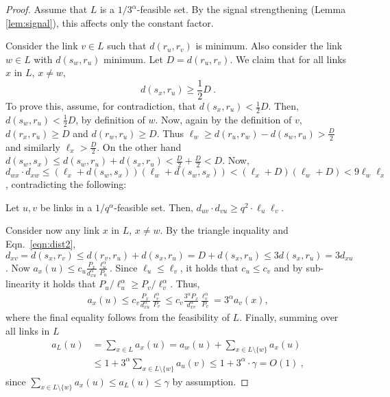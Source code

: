 \documentclass[11pt]{amsart}
\begin{document}
\begin{proof}
Assume that $L$ is a $1/3^\alpha$-feasible set. By the signal
strengthening (Lemma \ref{lem:signal}), this affects only the constant factor.

Consider the link $v \in L$ such that $d(r_u, r_v)$ is minimum.
Also consider the link $w \in L$ with $d(s_{w}, r_u)$ minimum.
Let $D = d(r_u, r_v)$. We claim that for all links $x$ in $L$, $x \ne w$,
\begin{equation}
d(s_x, r_u) \geq \frac{1}{2} D \ .
\label{eqn:dist2}
\end{equation}
To prove this, assume, for contradiction, that $d(s_x, r_u) < \frac{1}{2} D$. 
Then,  $d(s_w, r_u)  < \frac{1}{2} D$, by definition of $w$. 
Now, again by the definition of $v$, $d(r_{x}, r_u) \geq D$ 
and $d(r_w, r_u) \geq D$. 
Thus $\ell_w \geq d(r_u, r_w) - d(s_w, r_u) > \frac{D}{2}$
and similarly $\ell_{x} > \frac{D}{2}$. 
On the other hand $d(s_{w}, s_{x}) \le d(s_w, r_u) + d(s_x, r_u) < 
   \frac{D}{2} + \frac{D}{2} < D$.
Now, $d_{w x} \cdot d_{x w} 
  \leq (\ell_{x} + d(s_{w}, s_{x}))(\ell_w + d(s_w, s_{x})) 
  < (\ell_x + D)(\ell_w + D)
  < 9 \ell_{w} \ell_x$, contradicting the following:
  
  \begin{lemma}
Let $u, v$ be links in a $1/q^\alpha$-feasible set.
Then, $d_{uv} \cdot d_{vu} \ge q^2 \cdot \ell_u \ell_v$. 
\label{lem:ind-separation}
\end{lemma}


Consider now any link $x$ in $L$, $x \ne w$.
By the triangle inquality and Eqn.~\ref{eqn:dist2}, 
$d_{x v}  = d(s_x, r_v) \leq d(r_v, r_u) + d(s_x, r_u) = D + d(s_x, r_u)
   \leq 3 d(s_x, r_u) = 3 d_{x u}$. 
Now $a_{x}(u) \leq c_u \frac{P_{x}}{d_{x u}^{\alpha}} \frac{\ell_u^{\alpha}}{P_u}$. 
Since $\ell_u \leq \ell_v$, it holds that 
$c_u \le c_v$ and by sub-linearity it holds that
$P_u/\ell_u^\alpha \ge P_v/\ell_v^\alpha$.
Thus, 
\begin{align}
a_{x}(u) \leq c_v \frac{P_x}{d_{xu}^{\alpha}} \frac{\ell_v^{\alpha}}{P_v} 
   \leq c_v \frac{3^{\alpha} P_x}{d_{xv}^{\alpha}} \frac{\ell_v^{\alpha}}{P_v} 
  = 3^{\alpha} a_v(x),
\label{eq:affs1}
\end{align}
where the final equality follows from the feasibility of $L$.
Finally, summing over all links in $L$
\begin{align*}
a_L(u) & = \sum_{x \in L}  a_{x}(u)  = a_{w}(u) + \sum_{x \in L \setminus \{w\}}  a_{x}(u)\\
 & \leq 1 + 3^\alpha \sum_{x \in L \setminus \{w\}}  a_u(v) 
  \leq 1 + 3^\alpha \cdot \gamma = O(1) \ , 
\end{align*}
since $\sum_{x \in L \setminus \{w\}}  a_{x}(u) \leq a_L(u) \leq \gamma$ by assumption.
\end{proof}
\end{document}
